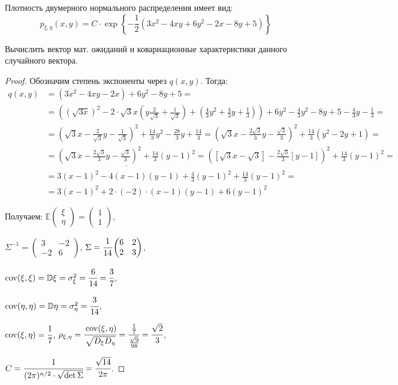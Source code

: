 
\renewcommand*{\proofname}{Решение}

Плотность двумерного нормального распределения имеет вид:
\[ p_{\xi,\eta}(x, y) = C \cdot \exp \left\{-\frac12(3x^2 - 4xy + 6y^2 - 2x - 8y + 5)\right\} \]

\begin{problem}
	Вычислить вектор мат. ожиданий и ковариационные характеристики данного случайного вектора.
\end{problem}

\begin{proof}
	Обозначим степень экспоненты через  $q(x,y)$. Тогда:
	\begin{align} 
		q(x,y)& = (3x^2-4xy-2x)+6y^2-8y+5= \\
		& = ((\sqrt{3x})^2-2\cdot \sqrt{3}x(y\frac{2}{\sqrt{3}}+\frac{1}{\sqrt{3}})+(\frac43y^2+\frac43y+\frac13))+6y^2-\frac43y^2-8y+5-\frac43y-\frac13= \\
		&  = (\sqrt{3}x-\frac{2}{\sqrt{3}}y-\frac{1}{\sqrt{3}})^2+\frac{14}{3}y^2-\frac{28}{3}y+\frac{14}{3}=(\sqrt{3}x-\frac{2\sqrt{3}}{3}y-\frac{\sqrt{3}}{3})^2+\frac{14}{3}(y^2-2y+1)= \\
		& = \underline{(\sqrt{3}x-\frac{2\sqrt{3}}{3}y-\frac{\sqrt{3}}{3})^2+\frac{14}{3}(y-1)^2}=([\sqrt{3}x-\sqrt{3}]-\frac{2\sqrt{3}}{3}[y-1])^2+\frac{14}{3}(y-1)^2= \\
		& = 3(x-1)^2-4(x-1)(y-1)+\frac43(y-1)^2+\frac{14}{3}(y-1)^2 = \\
		& = 3(x-1)^2+2\cdot(-2)\cdot(x-1)(y-1)+6(y-1)^2
	\end{align}

	Получаем:	
	$ \mathbb E\begin{pmatrix} \xi \\ \eta \end{pmatrix} = \begin{pmatrix} 1 \\ 1 \end{pmatrix}$,
	
	$ \Sigma^{-1} = \begin{pmatrix} 3 & -2 \\ -2 & 6 \end{pmatrix} $, 
	$ \Sigma = \cfrac1{14}\begin{pmatrix} 6 & 2 \\ 2 & 3 \end{pmatrix} $,
	
	$  \operatorname{\mathop{cov}}(\xi, \xi)=\mathbb D\xi = \sigma^2_\xi = \cfrac6{14} = \cfrac37 $,
	
	$  \operatorname{\mathop{cov}}(\eta, \eta)=\mathbb D\eta = \sigma^2_\eta = \cfrac3{14} $,
	
	$ \operatorname{\mathop{cov}}(\xi, \eta) = \cfrac17 $,
	$ \rho_{\xi, \eta}= \cfrac{\operatorname{\mathop{cov}}(\xi, \eta)}{\sqrt{D_\xi D_\eta}}=\cfrac{\frac17}{\frac{\sqrt{9}}{98}} = \cfrac{\sqrt2}3 $,
	
	$ C = \cfrac1{(2\pi)^{n/2}\cdot\sqrt{\det\Sigma}} = \cfrac{\sqrt{14}}{2\pi} $.
	
\end{proof}
